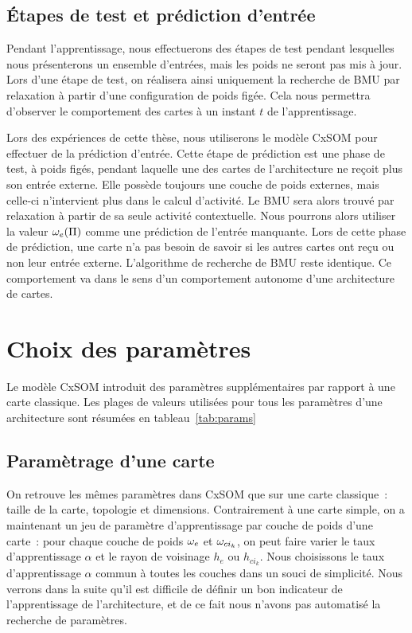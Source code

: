 \documentclass[../main]{subfiles}
\begin{document}
\subsection{\'Etapes de test et prédiction d'entrée}\label{sec:modele_test}

Pendant l'apprentissage, nous effectuerons des étapes de test pendant lesquelles nous présenterons un ensemble d'entrées, mais les poids ne seront pas mis à jour. Lors d'une étape de test, on réalisera ainsi uniquement la recherche de BMU par relaxation à partir d'une configuration de poids figée. Cela nous permettra d'observer le comportement des cartes à un instant $t$ de l'apprentissage.

Lors des expériences de cette thèse, nous utiliserons le modèle CxSOM pour effectuer de la prédiction d'entrée. 
Cette étape de prédiction est une phase de test, à poids figés, pendant laquelle une des cartes de l'architecture ne reçoit plus son entrée externe. Elle possède toujours une couche de poids externes, mais celle-ci n'intervient plus dans le calcul d'activité.
Le BMU sera alors trouvé par relaxation à partir de sa seule activité contextuelle.
Nous pourrons alors utiliser la valeur $\omega_e(\Pi)$ comme une prédiction de l'entrée manquante.
Lors de cette phase de prédiction, une carte n'a pas besoin de savoir si les autres cartes ont reçu ou non leur entrée externe. L'algorithme de recherche de BMU reste identique. Ce comportement va dans le sens d'un comportement autonome d'une architecture de cartes.

\section{Choix des paramètres}\label{sec:params}

Le modèle CxSOM introduit des paramètres supplémentaires par rapport à une carte classique. Les plages de valeurs utilisées pour tous les paramètres d'une architecture sont résumées en tableau~\ref{tab:params}

\subsection{Paramètrage d'une carte}
On retrouve les mêmes paramètres dans CxSOM que sur une carte classique~: taille de la carte, topologie et dimensions. 
Contrairement à une carte simple, on a maintenant un jeu de paramètre d'apprentissage par couche de poids d'une carte~: pour chaque couche de poids $\omega_e$ et $\omega_{ci_k}$, on peut faire varier le taux d'apprentissage $\alpha$ et le rayon de voisinage $h_e$ ou $h_{ci_k}$. 
Nous choisissons le taux d'apprentissage $\alpha$ commun à toutes les couches dans un souci de simplicité. Nous verrons dans la suite qu'il est difficile de définir un bon indicateur de l'apprentissage de l'architecture, et de ce fait nous n'avons pas automatisé la recherche de paramètres.
\end{document}
